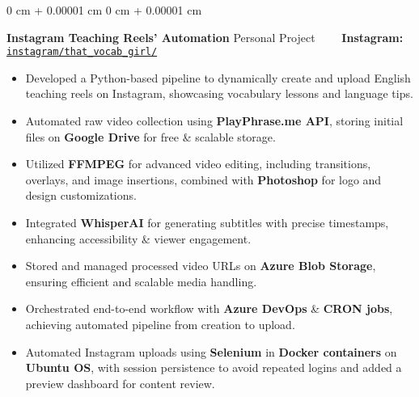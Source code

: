 \documentclass[10pt, letterpaper]{article}
\newenvironment{highlights}{
    \begin{itemize}[
        topsep=0.10 cm,
        parsep=0.10 cm,
        partopsep=0pt,
        itemsep=0pt,
        leftmargin=0 cm + 10pt
    ]
}{
    \end{itemize}
} %
\newenvironment{onecolentry}{
    \begin{adjustwidth}{
        0 cm + 0.00001 cm
    }{
        0 cm + 0.00001 cm
    }
}{
    \end{adjustwidth}
} %
\begin{document}
\begin{onecolentry}
	\textbf{Instagram Teaching Reels' Automation} \hfill Personal Project \ \ \ \ \textbf{Instagram:} \href{https://www.instagram.com/that_vocab_girl/}{\texttt{instagram/that\_vocab\_girl/}}
	\begin{highlights}
		\item Developed a Python-based pipeline to dynamically create and upload English teaching reels on Instagram, showcasing vocabulary lessons and language tips.
		\item Automated raw video collection using \textbf{PlayPhrase.me API}, storing initial files on \textbf{Google Drive} for free \& scalable storage.
		\item Utilized \textbf{FFMPEG} for advanced video editing, including transitions, overlays, and image insertions, combined with \textbf{Photoshop} for logo and design customizations.
		\item Integrated \textbf{WhisperAI} for generating subtitles with precise timestamps, enhancing accessibility \& viewer engagement.
		\item Stored and managed processed video URLs on \textbf{Azure Blob Storage}, ensuring efficient and scalable media handling.
		\item Orchestrated end-to-end workflow with \textbf{Azure DevOps} \& \textbf{CRON jobs}, achieving automated pipeline from creation to upload.
		\item Automated Instagram uploads using \textbf{Selenium} in \textbf{Docker containers} on \textbf{Ubuntu OS}, with session persistence to avoid repeated logins and added a preview dashboard for content review.
	\end{highlights}
\end{onecolentry}


\vspace{0.15 cm}
\end{document}
